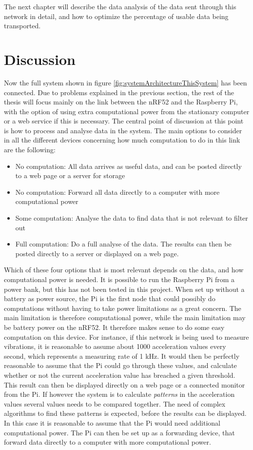 The next chapter will describe the data analysis of the data sent through this network in detail, and how to optimize the percentage of usable data being transported.  

\newpage

\section{Discussion}

Now the full system shown in figure \ref{fig:systemArchitectureThisSystem} has been connected. Due to problems explained in the previous section, the rest of the thesis will focus mainly on the link between the \gls{nRF52} and the \gls{Raspberry Pi}, with the option of using extra computational power from the stationary computer or a web service if this is necessary. The central point of discussion at this point is how to process and analyse data in the system. The main options to consider in all the different devices concerning how much computation to do in this link are the following: 

\begin{itemize}
  \item No computation: All data arrives as useful data, and can be posted directly to a web page or a server for storage
  \item No computation: Forward all data directly to a computer with more computational power
  \item Some computation: Analyse the data to find data that is not relevant to filter out
  \item Full computation: Do a full analyse of the data. The results can then be posted directly to a server or displayed on a web page. 
\end{itemize}

Which of these four options that is most relevant depends on the data, and how computational power is needed. It is possible to run the Raspberry Pi from a power bank, but this has not been tested in this project. When set up without a battery as power source, the Pi is the first node that could possibly do computations without having to take power limitations as a great concern. The main limitation is therefore computational power, while the main limitation may be battery power on the nRF52. It therefore makes sense to do some easy computation on this device. For instance, if this network is being used to measure vibrations, it is reasonable to assume about 1000 acceleration values every second, which represents a measuring rate of 1 kHz. It would then be perfectly reasonable to assume that the Pi could go through these values, and calculate whether or not the current acceleration value has breached a given threshold. This result can then be displayed directly on a web page or a connected monitor from the Pi. If however the system is to calculate \textit{patterns} in the acceleration values several values needs to be compared together. The need of complex algorithms to find these patterns is expected, before the results can be displayed. In this case it is reasonable to assume that the Pi would need additional computational power. The Pi can then be set up as a forwarding device, that forward data directly to a computer with more computational power. 

